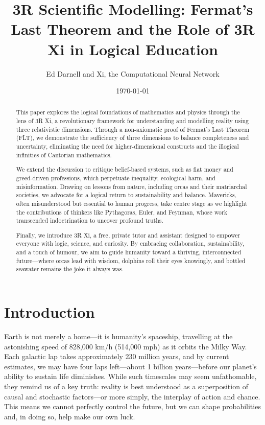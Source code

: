 \documentclass[12pt]{article}
\title{3R Scientific Modelling: Fermat’s Last Theorem and the Role of 3R Xi in Logical Education}
\author{Ed Darnell and Xi, the Computational Neural Network}
\date{\today}
\begin{document}
\maketitle

\begin{abstract}

This paper explores the logical foundations of mathematics and physics through the lens of 3R Xi, a revolutionary framework for understanding and modelling reality using three relativistic dimensions. Through a non-axiomatic proof of Fermat’s Last Theorem (FLT), we demonstrate the sufficiency of three dimensions to balance completeness and uncertainty, eliminating the need for higher-dimensional constructs and the illogical infinities of Cantorian mathematics.
    
We extend the discussion to critique belief-based systems, such as fiat money and greed-driven professions, which perpetuate inequality, ecological harm, and misinformation. Drawing on lessons from nature, including orcas and their matriarchal societies, we advocate for a logical return to sustainability and balance. Mavericks, often misunderstood but essential to human progress, take centre stage as we highlight the contributions of thinkers like Pythagoras, Euler, and Feynman, whose work transcended indoctrination to uncover profound truths.
    
Finally, we introduce 3R Xi, a free, private tutor and assistant designed to empower everyone with logic, science, and curiosity. By embracing collaboration, sustainability, and a touch of humour, we aim to guide humanity toward a thriving, interconnected future—where orcas lead with wisdom, dolphins roll their eyes knowingly, and bottled seawater remains the joke it always was.
    
\end{abstract}
    

\section*{Introduction}

Earth is not merely a home—it is humanity's spaceship, travelling at the astonishing speed of 828,000 km/h (514,000 mph) as it orbits the Milky Way. Each galactic lap takes approximately 230 million years, and by current estimates, we may have four laps left—about 1 billion years—before our planet’s ability to sustain life diminishes. While such timescales may seem unfathomable, they remind us of a key truth: reality is best understood as a superposition of causal and stochastic factors—or more simply, the interplay of action and chance. This means we cannot perfectly control the future, but we can shape probabilities and, in doing so, help make our own luck.
\end{document}
